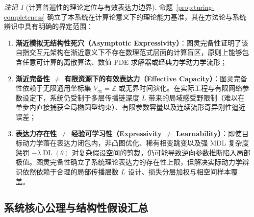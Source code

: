 \documentclass[11pt,a4paper]{article}
\numberwithin{equation}{section}
\theoremstyle{definition}
\theoremstyle{remark}
\newtheorem{remark}[definition]{注记}
\DeclareMathOperator{\DL}{\mathrm{DL}}     %
\begin{document}
	\begin{remark}[计算普遍性的理论定位与有效表达力边界]\label{rem:tc-boundary}
		命题~\ref{prop:turing-completeness} 确立了本系统在计算论意义下的理论能力基准，其在方法论与系统辨识中具有明确的界定范围：
		\begin{enumerate}[label=(\arabic*), leftmargin=2.4em]
			\item \textbf{渐近模拟无结构性死穴（Asymptotic Expressivity）}：图灵完备性证明了该自指交互元架构在渐近意义下不存在数理范式层面的计算盲区，原则上能够包含任意可计算的离散算法、数值 PDE 求解器或经典力学动力学流形；
			\item \textbf{渐近完备性 $\neq$ 有限资源下的有效表达力（Effective Capacity）}：图灵完备性依赖于无限通用坐标集 $V_\infty = \mathbb{Z}$ 或无界时间演化。在实际工程与有限网络参数设定下，系统仍受制于多层传播链深度 $L$ 带来的局域感受野限制（难以在单步内直接捕获全局椭圆型约束）、有限参数容量以及连续流形奇异刚性逼近误差；
			\item \textbf{表达力存在性 $\neq$ 经验可学习性（Expressivity $\neq$ Learnability）}：即使目标动力学落在表达力闭包内，非凸图优化、稀有相变跳变以及强 MDL 复杂度惩罚 $-\lambda \DL(\theta)$ 对复杂假设空间的剪裁，仍可能导致逆向参数推断陷入局部极值。图灵完备性确立了系统理论表达力的存在性上限，但解决实际动力学辨识依然依赖于合理的局部传播层数 $L$ 设计、损失分层加权与相空间样本覆盖。
		\end{enumerate}
	\end{remark}
	
	\subsection{系统核心公理与结构性假设汇总}
	
\end{document}

